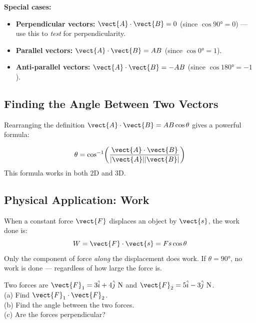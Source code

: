 \textbf{Special cases:}
\begin{itemize}[noitemsep]
  \item \textbf{Perpendicular vectors:}
  $\vect{A}\cdot\vect{B} = 0$
  (since $\cos 90° = 0$) ---
  use this to \textit{test} for perpendicularity.
  \item \textbf{Parallel vectors:}
  $\vect{A}\cdot\vect{B} = AB$
  (since $\cos 0° = 1$).
  \item \textbf{Anti-parallel vectors:}
  $\vect{A}\cdot\vect{B} = -AB$
  (since $\cos 180° = -1$).
\end{itemize}

\subsection*{Finding the Angle Between Two Vectors}

Rearranging the definition $\vect{A}\cdot\vect{B}
= AB\cos\theta$ gives a powerful formula:

\begin{lawbox}
\[
  \theta
  = \cos^{-1}\!\left(
    \frac{\vect{A}\cdot\vect{B}}{|\vect{A}||\vect{B}|}
  \right)
\]
This formula works in both 2D and 3D.
\end{lawbox}

\subsection*{Physical Application: Work}

\begin{keybox}
When a constant force $\vect{F}$ displaces an object
by $\vect{s}$, the work done is:
\[
  W = \vect{F}\cdot\vect{s} = Fs\cos\theta
\]
Only the component of force \textit{along} the
displacement does work. If $\theta = 90°$, no
work is done --- regardless of how large the force is.
\end{keybox}

\begin{examplebox}[2.13]
Two forces are
$\vect{F}_1 = 3\hat{i} + 4\hat{j}\ \text{N}$ and
$\vect{F}_2 = 5\hat{i} - 3\hat{j}\ \text{N}$.\\
(a) Find $\vect{F}_1 \cdot \vect{F}_2$.\\
(b) Find the angle between the two forces.\\
(c) Are the forces perpendicular?
\end{examplebox}

